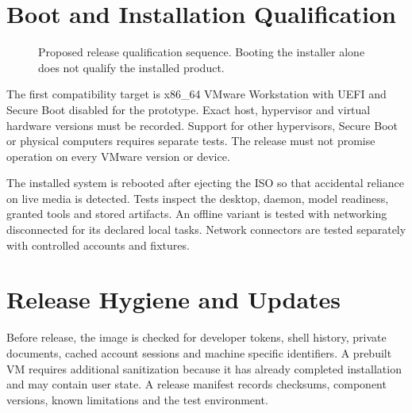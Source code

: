 \section{Boot and Installation Qualification}
\begin{figure}[htbp]\centering
{}
\caption{Proposed release qualification sequence. Booting the installer alone does not qualify the installed product.}\label{fig:boot}
\end{figure}

The first compatibility target is x86\_64 VMware Workstation with UEFI and Secure Boot disabled for the prototype. Exact host, hypervisor and virtual hardware versions must be recorded. Support for other hypervisors, Secure Boot or physical computers requires separate tests. The release must not promise operation on every VMware version or device.

The installed system is rebooted after ejecting the ISO so that accidental reliance on live media is detected. Tests inspect the desktop, daemon, model readiness, granted tools and stored artifacts. An offline variant is tested with networking disconnected for its declared local tasks. Network connectors are tested separately with controlled accounts and fixtures.

\section{Release Hygiene and Updates}
Before release, the image is checked for developer tokens, shell history, private documents, cached account sessions and machine specific identifiers. A prebuilt VM requires additional sanitization because it has already completed installation and may contain user state. A release manifest records checksums, component versions, known limitations and the test environment.


